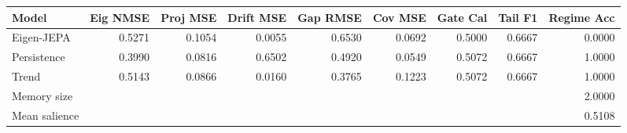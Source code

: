 \begin{tabular}{lrrrrrrrr}
\toprule
Model & Eig NMSE & Proj MSE & Drift MSE & Gap RMSE & Cov MSE & Gate Cal & Tail F1 & Regime Acc \\
\midrule
Eigen-JEPA & 0.5271 & 0.1054 & 0.0055 & 0.6530 & 0.0692 & 0.5000 & 0.6667 & 0.0000 \\
Persistence & 0.3990 & 0.0816 & 0.6502 & 0.4920 & 0.0549 & 0.5072 & 0.6667 & 1.0000 \\
Trend & 0.5143 & 0.0866 & 0.0160 & 0.3765 & 0.1223 & 0.5072 & 0.6667 & 1.0000 \\
\midrule
Memory size & \multicolumn{8}{r}{2.0000} \\
Mean salience & \multicolumn{8}{r}{0.5108} \\
\bottomrule
\end{tabular}
